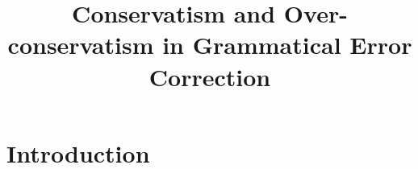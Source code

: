 \documentclass[letter,11pt]{article}
\begin{document}
	
\title{Conservatism and Over-conservatism in Grammatical Error Correction}



\maketitle

\begin{abstract}

\end{abstract}

\section{Introduction}



\end{document}
